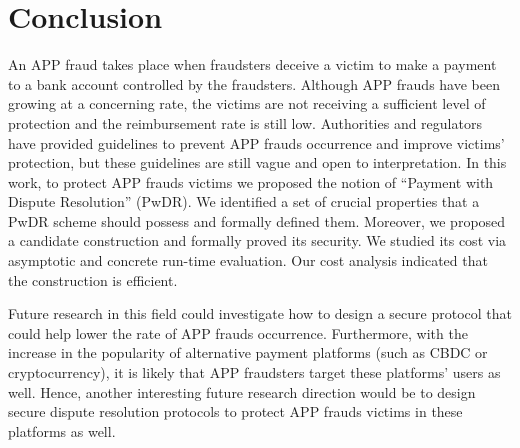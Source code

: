 

\section{Conclusion}


An APP fraud takes place when fraudsters deceive a victim to make a payment to a bank account controlled by the fraudsters. Although APP frauds have been growing at a concerning rate, the  victims are not receiving a sufficient level of protection and the reimbursement rate is still low. Authorities and regulators have  provided guidelines  to prevent APP frauds occurrence and improve victims’ protection, but these guidelines are still vague and open to interpretation. In this work, to protect APP frauds victims  we proposed the notion of “Payment with Dispute Resolution” (PwDR). We identified a set of crucial properties that a PwDR scheme should possess and formally defined them. Moreover,  we proposed a candidate construction and formally proved its security. We studied its cost via asymptotic and concrete run-time evaluation. Our cost analysis indicated that the construction is efficient. 


Future research in this field could investigate how to design a secure protocol that could help lower the rate of APP frauds occurrence. Furthermore, with the increase in the popularity of  alternative payment platforms (such as CBDC or cryptocurrency), it is likely that APP fraudsters target these platforms' users as well. Hence, another interesting future research direction would be to design secure dispute resolution protocols  to protect  APP frauds victims in these platforms as well. 



